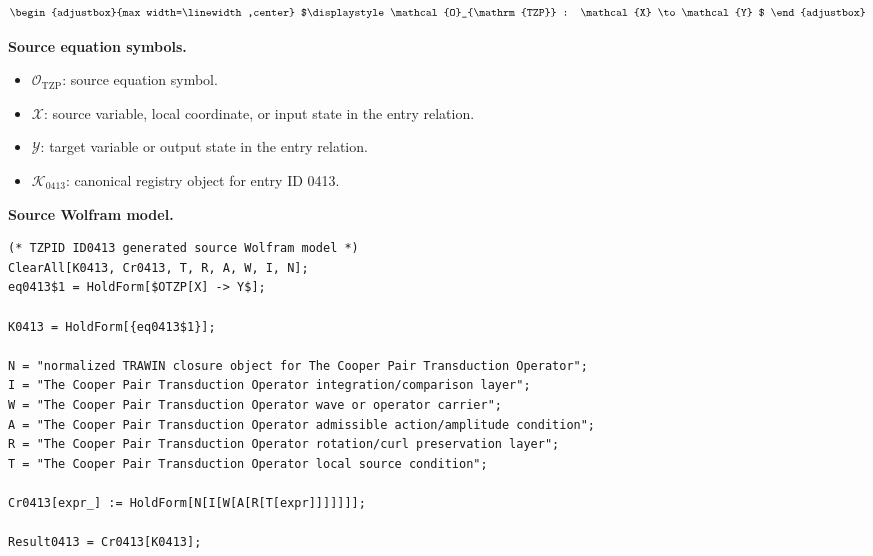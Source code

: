 \[
\begin{adjustbox}{max width=\linewidth,center}
$\displaystyle
\mathcal{O}_{\mathrm{TZP}} : \mathcal{X} \to \mathcal{Y}
$
\end{adjustbox}
\]

\begin{minipage}[t]{0.49\linewidth}
\begingroup
\small
\raggedright
\textbf{Source equation symbols.}\par
\begin{itemize}[leftmargin=1.35em,itemsep=1pt,topsep=1pt,parsep=0pt]
    \item $\mathcal{O}_{\mathrm{TZP}}$: source equation symbol.
    \item $\mathcal{X}$: source variable, local coordinate, or input state in the entry relation.
    \item $\mathcal{Y}$: target variable or output state in the entry relation.
    \item $\mathcal{K}_{0413}$: canonical registry object for entry ID 0413.
\end{itemize}
\endgroup
\end{minipage}\hfill
\begin{minipage}[t]{0.47\linewidth}
\begingroup
\scriptsize
\raggedright
\textbf{Source Wolfram model.}\par
\begin{Verbatim}[fontsize=\tiny,breaklines=true,breakanywhere=true]
(* TZPID ID0413 generated source Wolfram model *)
ClearAll[K0413, Cr0413, T, R, A, W, I, N];
eq0413$1 = HoldForm[$OTZP[X] -> Y$];

K0413 = HoldForm[{eq0413$1}];

N = "normalized TRAWIN closure object for The Cooper Pair Transduction Operator";
I = "The Cooper Pair Transduction Operator integration/comparison layer";
W = "The Cooper Pair Transduction Operator wave or operator carrier";
A = "The Cooper Pair Transduction Operator admissible action/amplitude condition";
R = "The Cooper Pair Transduction Operator rotation/curl preservation layer";
T = "The Cooper Pair Transduction Operator local source condition";

Cr0413[expr_] := HoldForm[N[I[W[A[R[T[expr]]]]]]];

Result0413 = Cr0413[K0413];
\end{Verbatim}
\endgroup
\end{minipage}

